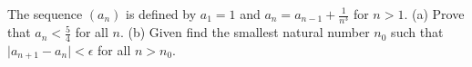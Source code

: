 The  sequence $(a_n)$ is  defined  by  $a_1=1$ and $a_n=a_{n-1}+\frac{1}{n^3}$  for  $n>1.$
(a) Prove  that   $a_n<\frac{5}{4}$    for all  $n.$
(b) Given  find  the smallest natural number  $n_0$  such  that  ${\mid a_{n+1}-a_n}\mid<\epsilon$  for all  $n>n_0.$